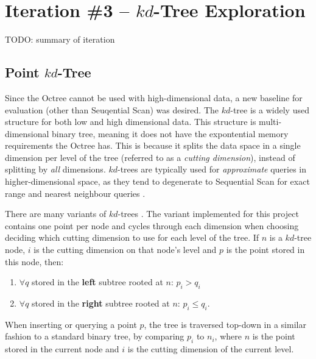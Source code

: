 \section{Iteration \#3 -- $kd$-Tree Exploration}

TODO: summary of iteration

\subsection{Point $kd$-Tree}

Since the Octree cannot be used with high-dimensional data, a new baseline for evaluation (other than Seuqential Scan) was desired. The $kd$-tree is a widely used structure for both low and high dimensional data. This structure is multi-dimensional binary tree, meaning it does not have the expontential memory requirements the Octree has. This is because it splits the data space in a single dimension per level of the tree (referred to as a \textit{cutting dimension}), instead of splitting by \textit{all} dimensions. $kd$-trees are typically used for \textit{approximate} queries in higher-dimensional space, as they tend to degenerate to Sequential Scan for exact range and nearest neighbour queries \cite{similarity-searching}.

There are many variants of $kd$-trees \cite{kd-tree, bkd-tree, kdb-tree}. The variant implemented for this project contains one point per node and cycles through each dimension when choosing deciding which cutting dimension to use for each level of the tree. If $n$ is a $kd$-tree node, $i$ is the cutting dimension on that node's level and $p$ is the point stored in this node, then:
\begin{enumerate}
	\item $\forall q$ stored in the \textbf{left} subtree rooted at $n$: $p_i > q_i$ 
	\item $\forall q$ stored in the \textbf{right} subtree rooted at $n$: $p_i \leq q_i$.
\end{enumerate}
When inserting or querying a point $p$, the tree is traversed top-down in a similar fashion to a standard binary tree, by comparing $p_i$ to $n_i$, where $n$ is the point stored in the current node and $i$ is the cutting dimension of the current level.


